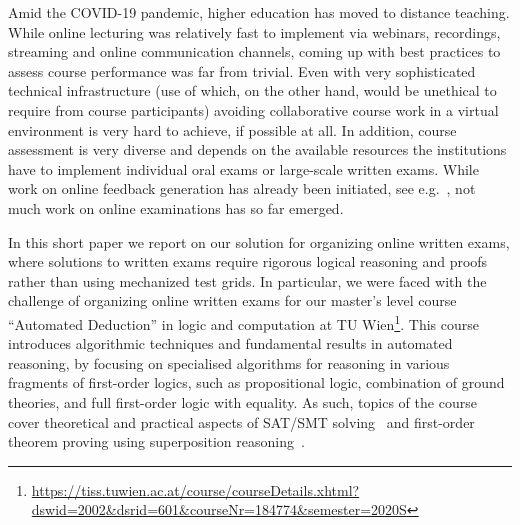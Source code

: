 Amid the COVID-19 pandemic, higher education has moved to distance
teaching. While online lecturing was relatively fast to implement via
webinars, recordings,  streaming and online communication channels,
coming up with best practices to assess course performance was far
from trivial. Even with very sophisticated technical infrastructure
(use of which, on the other hand, would be unethical to require from course
participants)  avoiding collaborative course work in a virtual
environment is very hard to achieve, if possible at all.
In addition, course assessment is very diverse and depends on the
available resources the  institutions have to implement individual oral
exams or large-scale written exams. While work on
online feedback generation has already been initiated, see
e.g.~\cite{Zuleger18,Wang18}, 
not much work on online examinations has so far emerged. 

In this short paper we report on our solution for organizing online
written exams, where solutions to written exams require rigorous
logical reasoning and proofs rather than using mechanized test grids.
In particular, we were faced with the challenge of organizing online
written exams for our master's level course ``Automated
Deduction'' in logic and computation at TU
Wien\footnote{\url{https://tiss.tuwien.ac.at/course/courseDetails.xhtml?dswid=2002\&dsrid=601\&courseNr=184774\&semester=2020S}}.
This course introduces algorithmic techniques and fundamental results
in automated reasoning, by focusing on specialised algorithms for
reasoning in various fragments of first-order logics, such as
propositional logic, combination of ground theories, and full
first-order logic with equality.
As such, topics of the course cover theoretical and practical
aspects of SAT/SMT solving~\cite{DPLL,Tinelli02,DPLLT} and first-order theorem proving using
superposition reasoning~\cite{Ganzinger01,Rubio01,Vampire13}.

